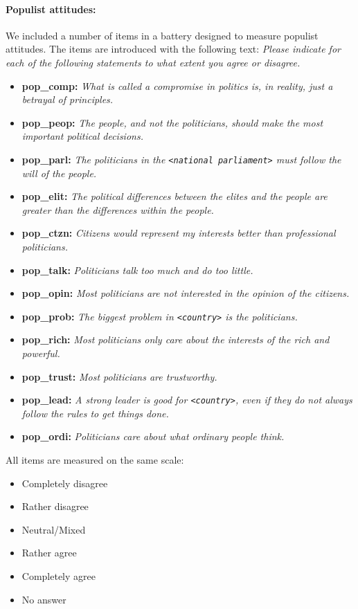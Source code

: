 \documentclass[12pt]{article}
\begin{document}
\paragraph{Populist attitudes:}
We included a number of items in a battery designed to measure populist attitudes. The items are introduced with the following text: \textit{Please indicate for each of the following statements to what extent you agree or disagree.}

\begin{itemize}
  \item \textbf{pop\_comp:} \textit{What is called a compromise in politics is, in reality, just a betrayal of principles.}
  \item \textbf{pop\_peop:} \textit{The people, and not the politicians, should make the most important political decisions.}
  \item \textbf{pop\_parl:} \textit{The politicians in the \texttt{<national parliament>} must follow the will of the people.}
  \item \textbf{pop\_elit:} \textit{The political differences between the elites and the people are greater than the differences within the people.}
  \item \textbf{pop\_ctzn:} \textit{Citizens would represent my interests better than professional politicians.}
  \item \textbf{pop\_talk:} \textit{Politicians talk too much and do too little.}
  \item \textbf{pop\_opin:} \textit{Most politicians are not interested in the opinion of the citizens.}
  \item \textbf{pop\_prob:} \textit{The biggest problem in \texttt{<country>} is the politicians.}
  \item \textbf{pop\_rich:} \textit{Most politicians only care about the interests of the rich and powerful.}
  \item \textbf{pop\_trust:} \textit{Most politicians are trustworthy.}
  \item \textbf{pop\_lead:} \textit{A strong leader is good for \texttt{<country>}, even if they do not always follow the rules to get things done.}
  \item \textbf{pop\_ordi:} \textit{Politicians care about what ordinary people think.}
\end{itemize}

All items are measured on the same scale:

\begin{itemize}
  \item Completely disagree
  \item Rather disagree
  \item Neutral/Mixed
  \item Rather agree
  \item Completely agree
  \item No answer
\end{itemize}
\end{document}
